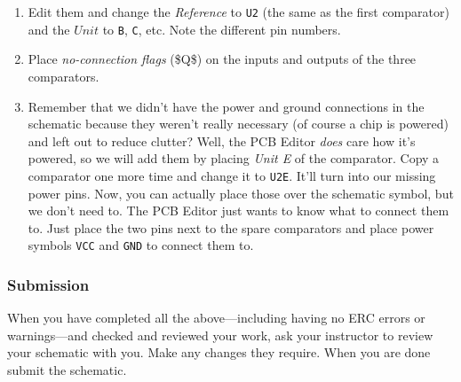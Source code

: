 \documentclass[
  letterpaper,
  DIV=11,
  numbers=noendperiod,
  oneside]{scrartcl}
\providecommand{\tightlist}{%
  \setlength{\itemsep}{0pt}\setlength{\parskip}{0pt}}\usepackage{longtable,booktabs,array}
\begin{document}
\begin{enumerate}
\begin{enumerate}
    \begin{enumerate}
    \def\labelenumiii{\alph{enumiii}.}
    \tightlist
    \item
      Edit them and change the \emph{Reference} to \texttt{U2} (the same
      as the first comparator) and the \(Unit\) to \texttt{B},
      \texttt{C}, etc. Note the different pin numbers.
    \item
      Place \emph{no-connection flags} (\$Q\$) on the inputs and outputs
      of the three comparators.
    \item
      Remember that we didn't have the power and ground connections in
      the schematic because they weren't really necessary (of course a
      chip is powered) and left out to reduce clutter? Well, the PCB
      Editor \emph{does} care how it's powered, so we will add them by
      placing \emph{Unit E} of the comparator. Copy a comparator one
      more time and change it to \texttt{U2E}. It'll turn into our
      missing power pins. Now, you can actually place those over the
      schematic symbol, but we don't need to. The PCB Editor just wants
      to know what to connect them to. Just place the two pins next to
      the spare comparators and place power symbols \texttt{VCC} and
      \texttt{GND} to connect them to.
    \end{enumerate}
  \end{enumerate}
\end{enumerate}

\subsubsection{Submission}\label{submission}

When you have completed all the above---including having no ERC errors
or warnings---and checked and reviewed your work, ask your instructor to
review your schematic with you. Make any changes they require. When you
are done submit the schematic.
\end{document}
